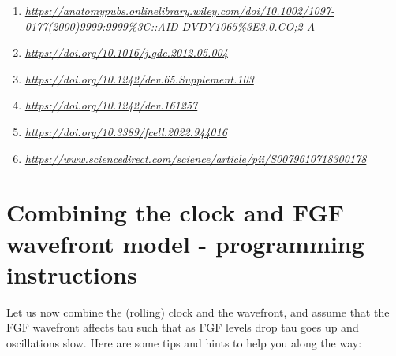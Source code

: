 \documentclass[
  letterpaper,
  DIV=11,
  numbers=noendperiod]{scrreprt}
\theoremstyle{definition}
\theoremstyle{remark}
\begin{document}
\begin{enumerate}
\def\labelenumi{(\alph{enumi})}
\item
  \href{https://anatomypubs.onlinelibrary.wiley.com/doi/10.1002/1097-0177(2000)9999:9999\%3C::AID-DVDY1065\%3E3.0.CO;2-A}{\emph{https://anatomypubs.onlinelibrary.wiley.com/doi/10.1002/1097-0177(2000)9999:9999\%3C::AID-DVDY1065\%3E3.0.CO;2-A}}
\item
  \href{https://doi.org/10.1016/j.gde.2012.05.004}{\emph{https://doi.org/10.1016/j.gde.2012.05.004}}
\item
  \href{https://doi.org/10.1242/dev.65.Supplement.103}{\emph{https://doi.org/10.1242/dev.65.Supplement.103}}
\item
  \href{https://doi.org/10.1242/dev.161257}{\emph{https://doi.org/10.1242/dev.161257}}
\item
  \href{https://doi.org/10.3389/fcell.2022.944016}{\emph{https://doi.org/10.3389/fcell.2022.944016}}
\item
  \href{https://www.sciencedirect.com/science/article/pii/S0079610718300178}{\emph{https://www.sciencedirect.com/science/article/pii/S0079610718300178}}
\end{enumerate}

\section{Combining the clock and FGF wavefront model - programming
instructions}\label{combining-the-clock-and-fgf-wavefront-model---programming-instructions}

Let us now combine the (rolling) clock and the wavefront, and assume
that the FGF wavefront affects tau such that as FGF levels drop tau goes
up and oscillations slow. Here are some tips and hints to help you along
the way:
\end{document}
